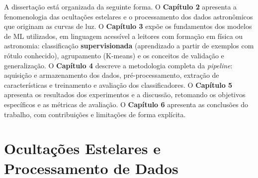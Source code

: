 \documentclass[msc]{on} %
\begin{document}
A dissertação está organizada da seguinte forma. O \textbf{Capítulo 2} apresenta a fenomenologia das ocultações estelares e o processamento dos dados astronômicos que originam as curvas de luz. O \textbf{Capítulo 3} expõe os fundamentos dos modelos de ML utilizados, em linguagem acessível a leitores com formação em física ou astronomia: classificação \textbf{supervisionada} (aprendizado a partir de exemplos com rótulo conhecido), agrupamento (K-means) e os conceitos de validação e generalização. O \textbf{Capítulo 4} descreve a metodologia completa da \textit{pipeline}: aquisição e armazenamento dos dados, pré-processamento, extração de características e treinamento e avaliação dos classificadores. O \textbf{Capítulo 5} apresenta os resultados dos experimentos e a discussão, retomando os objetivos específicos e as métricas de avaliação. O \textbf{Capítulo 6} apresenta as conclusões do trabalho, com contribuições e limitações de forma explícita.


\chapter{Ocultações Estelares e Processamento de Dados}


\end{document}
